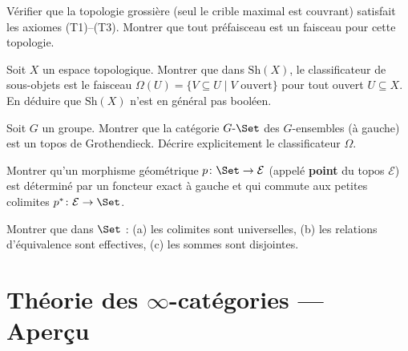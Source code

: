 \begin{exercice}\label{exo:topologie-triviale}
Vérifier que la topologie grossière (seul le crible maximal est
couvrant) satisfait les axiomes (T1)--(T3).  Montrer que tout
préfaisceau est un faisceau pour cette topologie.
\end{exercice}

\begin{exercice}\label{exo:omega-Sh}
Soit $X$ un espace topologique.  Montrer que dans $\mathrm{Sh}(X)$,
le classificateur de sous-objets est le faisceau
$\Omega(U) = \{V \subseteq U \mid V \text{ ouvert}\}$
pour tout ouvert $U \subseteq X$.
En déduire que $\mathrm{Sh}(X)$ n'est en général pas booléen.
\end{exercice}

\begin{exercice}\label{exo:G-set-topos}
Soit $G$ un groupe.  Montrer que la catégorie $G\text{-}\Set$ des
$G$-ensembles (à gauche) est un topos de Grothendieck.
Décrire explicitement le classificateur $\Omega$.
\end{exercice}

\begin{exercice}\label{exo:points-topos}
Montrer qu'un morphisme géométrique $p \colon \Set \to \mathcal{E}$
(appelé \textbf{point} du topos $\mathcal{E}$) est déterminé par
un foncteur exact à gauche et qui commute aux petites colimites
$p^* \colon \mathcal{E} \to \Set$.
\end{exercice}

\begin{exercice}\label{exo:giraud-conditions}
Montrer que dans $\Set$ :
(a) les colimites sont universelles,
(b) les relations d'équivalence sont effectives,
(c) les sommes sont disjointes.
\end{exercice}




\chapter{Théorie des $\infty$-catégories --- Aperçu}\label{ch:infty-cat}
\minitoc

